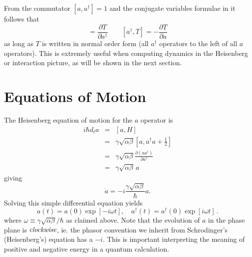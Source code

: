 From the commutator $ [a,a^{\dagger}]=1 $ and the conjugate variables formulae in \citeinternaltype {} it follows that \begin{equation}
[a,T] = \frac{\partial T}{\partial a^{\dagger}} \qquad [a^{\dagger},T] = -\frac{\partial T}{\partial a}\end{equation}
as long as $T$ is written in normal order form (all $a^{\dagger}$ operators to the left of all $a$ operators).
This is extremely useful when computing dynamics in the Heisenberg or interaction picture, as will be shown in the next section.

\section{Equations of Motion}

The Heisenberg equation of motion for the $a$ operator is \begin{eqnarray*}
i\hbar d_{t}a & = & [a,H] \\
& = & \gamma\sqrt{\alpha\beta}[a,a^{\dagger}a+\frac{1}{2}] \\
& = & \gamma\sqrt{\alpha\beta}\frac{\partial(aa^{\dagger})}{\partial a^{\dagger}} \\
& = & \gamma\sqrt{\alpha\beta}\,a \end{eqnarray*}
giving \begin{equation}
\dot{a} = -i\frac{\gamma\sqrt{\alpha\beta}}{\hbar}a .\end{equation}
Solving this simple differential equation yields
\begin{equation}
a(t) = a(0)\exp\left[-i \omega t \right],
\quad
a^{\dagger}(t) = a^{\dagger}(0)\exp\left[i \omega t \right] \, .
\end{equation}
where $\omega \equiv \gamma\sqrt{\alpha\beta}/\hbar$ as claimed above.
Note that the evolution of $a$ in the phase plane is $\emph{clockwise}$, ie. the phasor convention we inherit from Schrodinger's (Heisenberg's) equation has a $-i$.
This is important interpreting the meaning of positive and negative energy in a quantum calculation.

